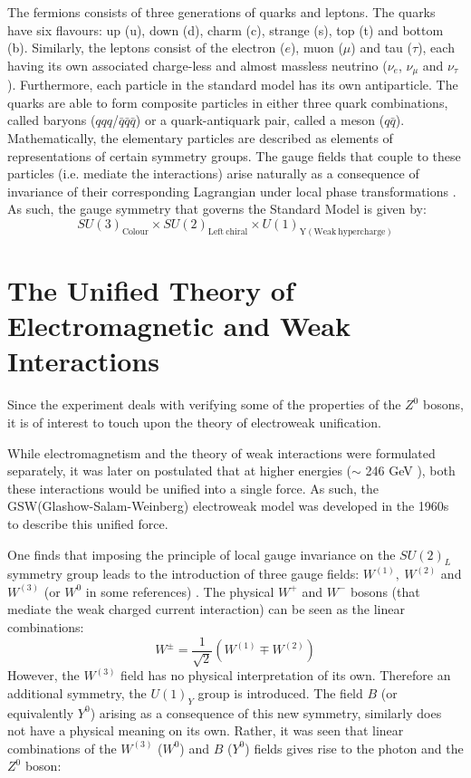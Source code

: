 The fermions consists of three generations of quarks and leptons. The quarks have six flavours: up (u), down (d), charm (c), strange (s), top (t) and bottom (b). Similarly, the leptons consist of the electron ($e$), muon ($\mu$) and tau ($\tau$), each having its own associated charge-less and almost massless neutrino ($\nu_{e}$, $\nu_{\mu}$ and $\nu_{\tau}$). Furthermore, each particle in the standard model has its own antiparticle. The quarks are able to form composite particles in either three quark combinations, called baryons ($qqq$/$\bar{q}\bar{q}\bar{q}$) or a quark-antiquark pair, called a meson ($q\bar{q}$). Mathematically, the elementary particles are described as elements of representations of certain symmetry groups. The gauge fields that couple to these particles (i.e. mediate the interactions) arise naturally as a consequence of invariance of their corresponding Lagrangian under local phase transformations \cite{thomson_2013}. As such, the gauge symmetry that governs the Standard Model is given by: $$SU(3)_{\mathrm{Colour}}\times SU(2)_{\mathrm{Left\ chiral}}\times U(1)_{\mathrm{Y}(\mathrm{Weak \ hypercharge})}$$

\section{The Unified Theory of Electromagnetic and Weak Interactions}
Since the experiment deals with verifying some of the properties of the $Z^{0}$ bosons, it is of interest to touch upon the theory of electroweak unification.

While electromagnetism and the theory of weak interactions were formulated separately, it was later on postulated that at higher energies ($\sim$ 246 GeV \cite{pdg-ew}), both these interactions would be unified into a single force. As such, the GSW(Glashow-Salam-Weinberg) electroweak model was developed in the 1960s to describe this unified force. 

One finds that imposing the principle of local gauge invariance on the $SU(2)_{L}$ symmetry group leads to the introduction of three gauge fields: $W^{(1)},\ W^{(2)}$ and $W^{(3)}$ (or $W^{0}$ in some references) \cite{thomson_2013}. The physical $W^{+}$ and $W^{-}$ bosons (that mediate the weak charged current interaction) can be seen as the linear combinations: 
\begin{equation}
W^{\pm}=\dfrac{1}{\sqrt{2}}\left(W^{(1)}\mp W^{(2)}\right)
\end{equation}
However, the $W^{(3)}$ field has no physical interpretation of its own. Therefore an additional symmetry, the $U(1)_{Y}$ group is introduced. The field $B$ (or equivalently $Y^{0}$) arising as a consequence of this new symmetry, similarly does not have a physical meaning on its own. Rather, it was seen that linear combinations of the $W^{(3)}$ ($W^{0}$) and $B$ ($Y^{0}$) fields gives rise to the  photon and the $Z^{0}$ boson:

